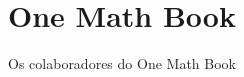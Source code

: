 \documentclass[11pt,a4paper,twoside,openany]{book}
\title{One Math Book}
\author{Os colaboradores do One Math Book}
\date{\bookdate}
\begin{document}
\frontmatter



\tableofcontents

\mainmatter



\appendix
\part{\omsolutionspart}


\backmatter
\printindex
\end{document}
